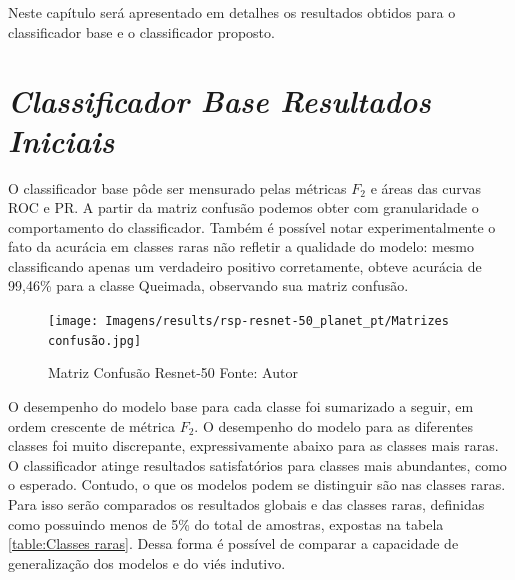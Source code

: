 
Neste capítulo será apresentado em detalhes os resultados obtidos para o classificador base e o classificador proposto.

\section{\textit{Classificador Base Resultados Iniciais}}\label{sec:Cap4_ResultadosPreliminares}


O classificador base pôde ser mensurado pelas métricas $F_2$ e áreas das curvas ROC e PR. A partir da matriz confusão podemos obter com granularidade o comportamento do classificador. Também é possível notar experimentalmente o fato da acurácia em classes raras não refletir a qualidade do modelo: mesmo classificando apenas um verdadeiro positivo corretamente, obteve acurácia de 99,46\% para a classe Queimada, observando sua matriz confusão.

\begin{figure}[!ht]
    \centering
    \texttt{[image: Imagens/results/rsp-resnet-50\_planet\_pt/Matrizes confusão.jpg]}
    \caption{ Matriz Confusão Resnet-50
    Fonte: Autor}
    \label{fig:Matriz Confusao Resnet50}
\end{figure} 


O desempenho do modelo base para cada classe foi sumarizado a seguir, em ordem crescente de métrica $F_2$. O desempenho do modelo para as diferentes classes foi muito discrepante, expressivamente abaixo para as classes mais raras. O classificador atinge resultados satisfatórios para classes mais abundantes, como o esperado. Contudo, o que os modelos podem se distinguir são nas classes raras. Para isso serão comparados os resultados globais e das classes raras, definidas como possuindo menos de 5\% do total de amostras, expostas na tabela \ref{table:Classes raras}. Dessa forma é possível de comparar a capacidade de generalização dos modelos e do viés indutivo.

